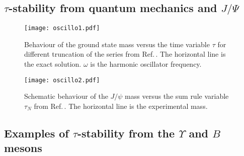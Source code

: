 \documentclass[aps,prd,groupedaddress,nofootinbib]{revtex4-1}
\begin{document}
\subsection{$\tau$-stability from quantum mechanics and $J/\Psi$}
\begin{figure}[H]
\begin{center}
\texttt{[image: oscillo1.pdf]}
\caption{\normalsize Behaviour of the ground state mass versus the time variable $\tau$ for different truncation of the series from Ref.\,\cite{BELLa,BERTa}. The horizontal line is the exact solution. $\omega$ is the harmonic oscillator frequency.}
\label{fig:oscillo1}
\end{center}
\end{figure} 

\begin{figure}[hbt]
\begin{center}
\texttt{[image: oscillo2.pdf]}
\caption{\normalsize  Schematic behaviour of the $J/\psi$ mass  versus the sum rule variable $\tau_N$ from Ref.\,\cite{BELLa,BERTa}. The horizontal line is the experimental mass.} \label{fig:oscillo2}
\end{center}
\end{figure} 
\subsection{Examples of $\tau$-stability from the $\Upsilon$ and $B$ mesons}
\end{document}

